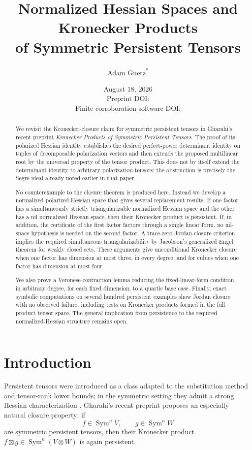 \documentclass[11pt]{amsart}
\title[Normalized Hessian Spaces and Kronecker Products]{Normalized Hessian Spaces and Kronecker Products\\of Symmetric Persistent Tensors}
\author[Adam Guetz]{Adam Guetz\textsuperscript{*}}
\date{August 18, 2026\\Preprint DOI: \PaperDOI\\Finite corroboration software DOI: \SoftwareDOI}
\newcommand{\Sym}{\operatorname{Sym}}
\newcommand{\boxt}{\mathbin{\boxtimes}}
\begin{document}
\begin{abstract}
We revisit the Kronecker-closure claim for symmetric persistent tensors in
Gharahi's recent preprint \emph{Kronecker Products of Symmetric Persistent
Tensors}.  The proof of its polarized Hessian identity establishes the desired
perfect-power determinant identity on tuples of decomposable polarization
vectors and then extends the proposed multilinear root by the universal
property of the tensor product.  This does not by itself extend the determinant
identity to arbitrary polarization tensors: the obstruction is precisely the
Segre ideal already noted earlier in that paper.

No counterexample to the closure theorem is produced here.  Instead we develop
a normalized polarized-Hessian space that gives several replacement results.
If one factor has a simultaneously strictly triangularizable normalized
Hessian space and the other has a nil normalized Hessian space, then their
Kronecker product is persistent.  If, in addition, the certificate of the first
factor factors through a single linear form, no nil-space hypothesis is needed
on the second factor.  A trace-zero Jordan-closure criterion implies the
required simultaneous triangularizability by Jacobson's generalized Engel
theorem for weakly closed sets.  These arguments give unconditional Kronecker
closure when one factor has dimension at most three, in every degree, and for
cubics when one factor has dimension at most four.

We also prove a Veronese-contraction lemma reducing the fixed-linear-form
condition in arbitrary degree, for each fixed dimension, to a quartic base
case.  Finally, exact symbolic computations on several hundred persistent
examples show Jordan closure with no observed failure, including tests on
Kronecker products formed in the full product tensor space.  The general
implication from persistence to the required normalized-Hessian structure
remains open.
\end{abstract}

\maketitle

\section{Introduction}

Persistent tensors were introduced as a class adapted to the substitution
method and tensor-rank lower bounds; in the symmetric setting they admit a
strong Hessian characterization \cite{GO25,GL24}.  Gharahi's recent preprint
\cite{G26} proposes an especially natural closure property: if
\[
  f\in \Sym^n V,\qquad g\in \Sym^n W
\]
are symmetric persistent tensors, then their Kronecker product
$f\boxt g\in\Sym^n(V\otimes W)$ is again persistent.
\end{document}
